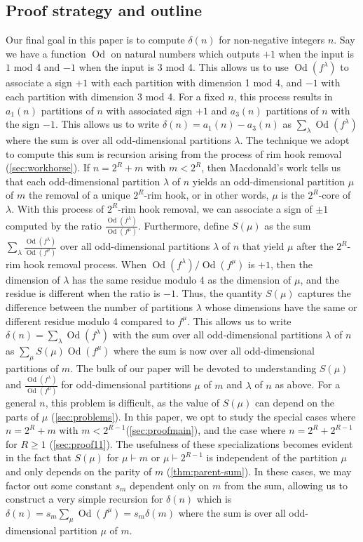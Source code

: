 \documentclass[12pt]{amsart}
\theoremstyle{definition}
\numberwithin{equation}{section}
\newcommand{\la}{\lambda}
\DeclareMathOperator{\Od}{Od}
\begin{document}
 \subsection{Proof strategy and outline}\label{ssec:outline}
Our final goal in this paper is to compute $\delta(n)$ for non-negative integers $n$. Say we have a function $\Od$ on natural numbers which outputs $+1$ when the input is $1$ mod 4 and $-1$ when the input is $3$ mod 4. This allows us to use $\Od(f^\la)$ to associate a sign $+1$ with each partition with dimension 1 mod 4, and $-1$ with each partition with dimension 3 mod 4. For a fixed $n$, this process results in $a_1(n)$ partitions of $n$ with associated sign $+1$ and $a_3(n)$ partitions of $n$ with the sign $-1$. This allows us to write $\delta(n) = a_1(n) - a_3(n)$ as $\sum_{\la} \Od(f^\la)$ where the sum is over all odd-dimensional partitions $\la$. The technique we adopt to compute this sum is recursion arising from the process of rim hook removal (\cref{sec:workhorse}). If $n = 2^R + m$ with $m < 2^R$, then Macdonald's work \cite{mcd} tells us that each odd-dimensional partition $\la$ of $n$ yields an odd-dimensional partition $\mu$ of $m$ the removal of a unique $2^R$-rim hook, or in other words, $\mu$ is the $2^R$-core of $\la$. With this process of $2^R$-rim hook removal, we can associate a sign of $\pm 1$ computed by the ratio $\frac{\Od(f^\la)}{\Od(f^\mu)}$. Furthermore, define $S(\mu)$ as the sum $\sum_\la \frac{\Od(f^\la)}{\Od(f^\mu)}$ over all odd-dimensional partitions $\la$ of $n$ that yield $\mu$ after the $2^R$-rim hook removal process. When $\Od(f^\la)/\Od(f^\mu)$ is $+1$, then the dimension of $\la$ has the same residue modulo 4 as the dimension of $\mu$, and the residue is different when the ratio is $-1$. Thus, the quantity $S(\mu)$ captures the difference between the number of partitions $\la$ whose dimensions have the same or different residue modulo 4 compared to $f^\mu$. This allows us to write $\delta(n) = \sum_{\la} \Od(f^\la)$ with the sum over all odd-dimensional partitions $\la$ of $n$ as $\sum_{\mu} S(\mu) \Od(f^\mu)$ where the sum is now over all odd-dimensional partitions of $m$. 
The bulk of our paper will be devoted to understanding $S(\mu)$ and $\frac{\Od(f^\la)}{\Od(f^\mu)}$ for odd-dimensional partitions $\mu$ of $m$ and $\la$ of $n$ as above. For a general $n$, this problem is difficult, as the value of $S(\mu)$ can depend on the parts of $\mu$ (\cref{sec:problems}). In this paper, we opt to study the special cases where $n = 2^R + m$ with $m < 2^{R-1}$(\cref{sec:proofmain}), and the case where $n = 2^R + 2^{R-1}$ for $R\geq 1$ (\cref{sec:proof11}). The usefulness of these specializations becomes evident in the fact that $S(\mu)$ for $\mu \vdash m$ or $\mu \vdash 2^{R-1}$ is independent of the partition $\mu$ and only depends on the parity of $m$ (\cref{thm:parent-sum}). In these cases, we may factor out some constant $s_m$ dependent only on $m$ from the sum, allowing us to construct a very simple recursion for $\delta(n)$ which is $\delta(n) =s_m\sum_{\mu} \Od(f^\mu)=s_m\delta(m)$ where the sum is over all odd-dimensional partition $\mu$ of $m$.
\end{document}
